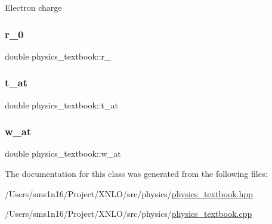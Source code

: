 Electron charge \mbox{\label{classphysics__textbook_ac429976f0dc885d846d8b31c24f45bd6}} 
\subsubsection{\texorpdfstring{r\_0}{r\_0}}
{\footnotesize\ttfamily double physics\+\_\+textbook\+::r\+\_}

\mbox{\label{classphysics__textbook_acdcf772ff70c544f8394b3a9fc57674c}} 
\subsubsection{\texorpdfstring{t\_at}{t\_at}}
{\footnotesize\ttfamily double physics\+\_\+textbook\+::t\+\_\+at}

\mbox{\label{classphysics__textbook_a63250c79f053fa4aa1c8f3505971b4f1}} 
\subsubsection{\texorpdfstring{w\_at}{w\_at}}
{\footnotesize\ttfamily double physics\+\_\+textbook\+::w\+\_\+at}



The documentation for this class was generated from the following files\+:\begin{DoxyCompactItemize}
\item 
/\+Users/sms1n16/\+Project/\+X\+N\+L\+O/src/physics/\mbox{\hyperlink{physics__textbook_8hpp}{physics\+\_\+textbook.\+hpp}}\item 
/\+Users/sms1n16/\+Project/\+X\+N\+L\+O/src/physics/\mbox{\hyperlink{physics__textbook_8cpp}{physics\+\_\+textbook.\+cpp}}\end{DoxyCompactItemize}
